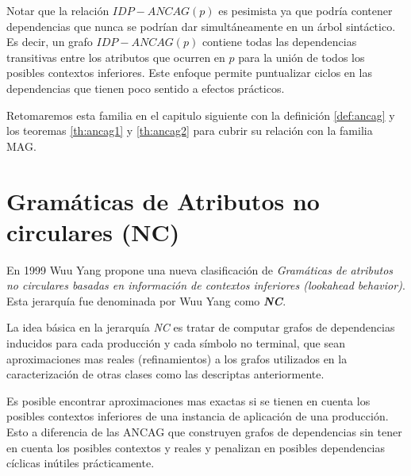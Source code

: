 Notar que la relación $IDP-ANCAG(p)$ es pesimista ya que podría contener dependencias que nunca se podrían dar simultáneamente en un árbol sintáctico. Es decir, un grafo $IDP-ANCAG(p)$ contiene todas las dependencias transitivas entre los atributos que ocurren en $p$ para la unión de todos los posibles contextos inferiores. Este enfoque permite puntualizar ciclos en las dependencias que tienen poco sentido a efectos prácticos.

Retomaremos esta familia en el capitulo siguiente con la definición \ref{def:ancag} y los teoremas \ref{th:ancag1} y \ref{th:ancag2} para cubrir su relación con la familia MAG.

\section{Gramáticas de Atributos no circulares (NC)}

En 1999 Wuu Yang\cite{wuu-yang2} propone una nueva clasificación de \emph{Gramáticas de atributos no circulares basadas en información de contextos inferiores (lookahead behavior)}. Esta jerarquía fue denominada por Wuu Yang como  \emph{\textbf{NC}}.

La idea básica en la jerarquía \emph{NC} es tratar de computar grafos de dependencias inducidos para cada producción y cada símbolo no terminal, que sean aproximaciones mas reales (refinamientos) a los grafos utilizados en la caracterización de otras clases como las descriptas anteriormente. 

Es posible encontrar aproximaciones mas exactas si se tienen en cuenta los posibles contextos inferiores de una instancia de aplicación de una producción. Esto a diferencia de las ANCAG que construyen grafos de dependencias sin tener en cuenta los posibles contextos y reales y penalizan en posibles dependencias cíclicas inútiles prácticamente. 


